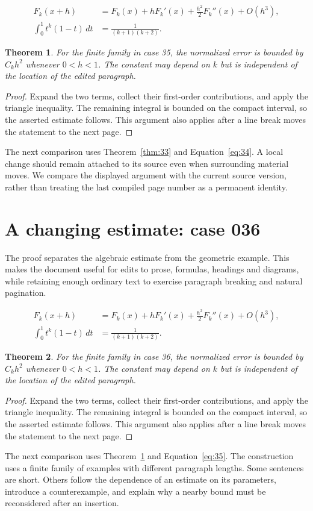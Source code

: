 \documentclass[a4paper,10pt]{article}
\newtheorem{theorem}{Theorem}[section]
\begin{document}
\lipsum[13-14]
\begin{align}\label{eq:34}
 F_k(x+h)&=F_k(x)+hF_k'(x)+\frac{h^2}{2}F_k''(x)+O(h^3),\\
 \int_0^1 t^k(1-t)\,dt&=\frac{1}{(k+1)(k+2)}.
\end{align}
\begin{theorem}\label{thm:34}
For the finite family in case 35, the normalized error is bounded by $C_k h^2$ whenever $0<h<1$. The constant may depend on $k$ but is independent of the location of the edited paragraph.
\end{theorem}
\begin{proof}
Expand the two terms, collect their first-order contributions, and apply the
triangle inequality. The remaining integral is bounded on the compact interval,
so the asserted estimate follows. This argument also applies after a line break
moves the statement to the next page.
\end{proof}
The next comparison uses Theorem~\ref{thm:33} and Equation~\ref{eq:34}. A local change should remain attached to its source even when surrounding material moves. We compare the displayed argument with the current source version, rather than treating the last compiled page number as a permanent identity.

\lipsum[23]

\section{A changing estimate: case 036}\label{unit:35}
The proof separates the algebraic estimate from the geometric example. This makes the document useful for edits to prose, formulas, headings and diagrams, while retaining enough ordinary text to exercise paragraph breaking and natural pagination.

\lipsum[16-17]
\begin{align}\label{eq:35}
 F_k(x+h)&=F_k(x)+hF_k'(x)+\frac{h^2}{2}F_k''(x)+O(h^3),\\
 \int_0^1 t^k(1-t)\,dt&=\frac{1}{(k+1)(k+2)}.
\end{align}
\begin{theorem}\label{thm:35}
For the finite family in case 36, the normalized error is bounded by $C_k h^2$ whenever $0<h<1$. The constant may depend on $k$ but is independent of the location of the edited paragraph.
\end{theorem}
\begin{proof}
Expand the two terms, collect their first-order contributions, and apply the
triangle inequality. The remaining integral is bounded on the compact interval,
so the asserted estimate follows. This argument also applies after a line break
moves the statement to the next page.
\end{proof}
The next comparison uses Theorem~\ref{thm:34} and Equation~\ref{eq:35}. The construction uses a finite family of examples with different paragraph lengths. Some sentences are short. Others follow the dependence of an estimate on its parameters, introduce a counterexample, and explain why a nearby bound must be reconsidered after an insertion.
\end{document}
